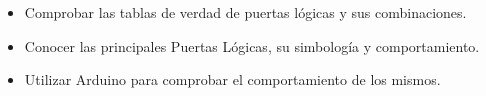 \begin{itemize}
    \item Comprobar las tablas de verdad de puertas lógicas y sus combinaciones.
    \item Conocer las principales Puertas Lógicas, su simbología y comportamiento.
    \item Utilizar Arduino para comprobar el comportamiento de los mismos.
\end{itemize}